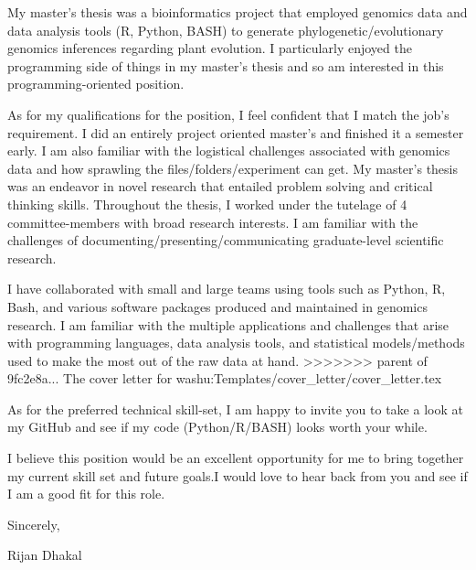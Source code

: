 \documentclass[a4paper, 12pt]{article}
\def\name{Rijan Dhakal}
\begin{document}
My master’s thesis was a bioinformatics project that employed genomics data and data analysis tools (R, Python, BASH) to generate phylogenetic/evolutionary genomics inferences regarding plant evolution. I particularly enjoyed the programming side of things in my master’s thesis and so am interested in this programming-oriented position.

As for my qualifications for the position, I feel confident that I match the job’s requirement. I did an entirely project oriented master’s and finished it a semester early. I am also familiar with the logistical challenges associated with genomics data and how sprawling the files/folders/experiment can get. My master’s thesis was an endeavor in novel research that entailed problem solving and critical thinking skills. Throughout the thesis, I worked under the tutelage of 4 committee-members with broad research interests. I am familiar with the challenges of documenting/presenting/communicating graduate-level scientific research.

I have collaborated with small and large teams using tools such as Python, R, Bash, and various software packages produced and maintained in genomics research. I am familiar with the multiple applications and challenges that arise with programming languages, data analysis tools, and statistical models/methods used to make the most out of the raw data at hand. 
>>>>>>> parent of 9fc2e8a... The cover letter for washu:Templates/cover_letter/cover_letter.tex

As for the preferred technical skill-set, I am happy to invite you to take a look at my GitHub and see if my code (Python/R/BASH) looks worth your while. 


I believe this position would be an excellent opportunity for me to bring together my current skill set and future goals.I would love to hear back from you and see if I am a good fit for this role.

Sincerely,

\name
\end{document}
